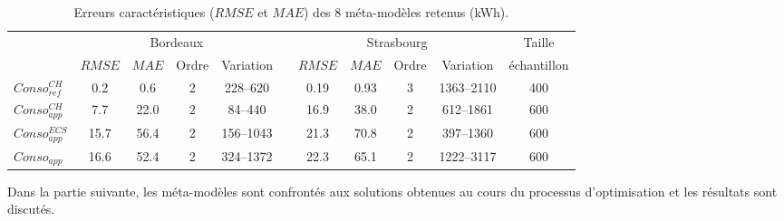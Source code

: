 \begin{table}
\centering
\caption[Erreurs caractéristiques des huit méta-modèles retenus]
        {Erreurs caractéristiques ($RMSE$ et $MAE$) des \num{8} méta-modèles retenus (\si{kWh}).}
\label{tab:meta_result_bilan}
\begin{tabular}{l c c c c c c c c c c}
    \toprule
                    & \multicolumn{4}{c}{Bordeaux} & & \multicolumn{4}{c}{Strasbourg} &
                      Taille \\
                    \cmidrule(r){2-5}
                    \cmidrule(r){7-10}
                    & $RMSE$ & $MAE$  & Ordre & Variation  &       & $RMSE$ & $MAE$ & Ordre & Variation & échantillon \\
    \midrule
    $Conso_{ref}^{CH}$  & \num{0.2}  & \num{0.6}  & \num{2} & \numrange{228}{620}&   & \num{0.19}   & \num{0.93}  & \num{3}     & \numrange{1363}{2110}      & \num{400}  \\
    \addlinespace[\defaultaddspace]
    $Conso_{app}^{CH}$  & \num{7.7}  & \num{22.0} & \num{2} & \numrange{84}{440} &   & \num{16.9}   & \num{38.0}  & \num{2}     & \numrange{612}{1861}       & \num{600} \\
    \addlinespace[\defaultaddspace]
    $Conso_{app}^{ECS}$ & \num{15.7} & \num{56.4} & \num{2} & \numrange{156}{1043}&  & \num{21.3}   & \num{70.8}  & \num{2}     & \numrange{397}{1360}       & \num{600} \\
    \addlinespace[\defaultaddspace]
    $Conso_{app}$       & \num{16.6} & \num{52.4} & \num{2} & \numrange{324}{1372}&  & \num{22.3}   & \num{65.1}  & \num{2}     & \numrange{1222}{3117}       & \num{600} \\
    \bottomrule
\end{tabular}
\end{table}

Dans la partie suivante, les méta-modèles sont confrontés aux solutions obtenues
au cours du processus d’optimisation et les résultats sont discutés.



